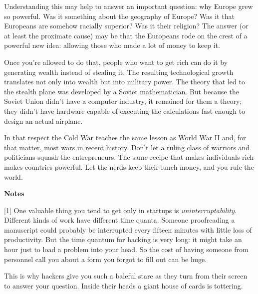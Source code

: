 Understanding
                    this may help to answer an important question: why Europe
                    grew so powerful. Was it something about the geography of
                    Europe? Was it that Europeans are somehow racially superior?
                    Was it their religion? The answer (or at least the proximate
                    cause) may be that the Europeans rode on the crest of a
                    powerful new idea: allowing those who made a lot of money to
                    keep it.

Once you're allowed to do that, people
                    who want to get rich can do it by generating wealth instead
                    of stealing it. The resulting technological growth
                    translates not only into wealth but into military power. The
                    theory that led to the stealth plane was developed by a
                    Soviet mathematician. But because the Soviet Union didn't
                    have a computer industry, it remained for them a theory;
                    they didn't have hardware capable of executing the
                    calculations fast enough to design an actual airplane.

In
                    that respect the Cold War teaches the same lesson as World
                    War II and, for that matter, most wars in recent history.
                    Don't let a ruling class of warriors and politicians squash
                    the entrepreneurs. The same recipe that makes individuals
                    rich makes countries powerful. Let the nerds keep their
                    lunch money, and you rule the world.



\textbf{Notes}

[1] One valuable thing you tend to get only in startups is
                    \emph{uninterruptability}. Different kinds of work have
                    different time quanta. Someone proofreading a manuscript
                    could probably be interrupted every fifteen minutes with
                    little loss of productivity. But the time quantum for
                    hacking is very long: it might take an hour just to load a
                    problem into your head. So the cost of having someone from
                    personnel call you about a form you forgot to fill out can
                    be huge.

This is why hackers give you such a
                    baleful stare as they turn from their screen to answer your
                    question. Inside their heads a giant house of cards is
                    tottering.

